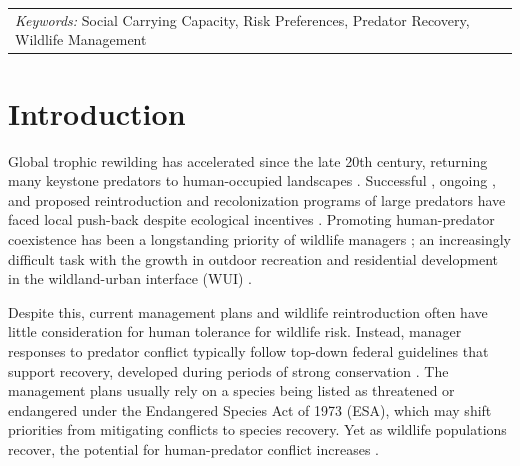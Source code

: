 \documentclass[english,12pt]{article}
\begin{document}
\noindent\begin{tabular}{ll}
\textit{Keywords:} Social Carrying Capacity, Risk Preferences, Predator Recovery, Wildlife Management\\
\end{tabular}



\thispagestyle{empty}
\newpage


\thispagestyle{empty}
\clearpage

\doublespacing
\linenumbers
\setcounter{page}{2}
\section{Introduction}
\label{sec: intro}
Global trophic rewilding has accelerated since the late 20th century, returning many keystone predators to human-occupied landscapes \citep{svenning}. Successful \citep{smith2003yellowstone, simon2012reverse}, ongoing \citep{wilting2015planning, coogan2018towards, ditmer2023predicting}, and proposed reintroduction and recolonization \citep{connolly2023jaguars, tordiffe2023case} programs of large predators have faced local push-back despite ecological incentives \citep{ripple2014status, stier2016ecosystem}. Promoting human-predator coexistence has been a longstanding priority of wildlife managers \citep{dickman2011review, nyhus2016human}; an increasingly difficult task with the growth in outdoor recreation and residential development in the wildland-urban interface (WUI) \citep{Abrahms2021Science, abrahms2023climate, ma2024global}.

Despite this, current management plans and wildlife reintroduction often have little consideration for human tolerance for wildlife risk. Instead, manager responses to predator conflict typically follow top-down federal guidelines that support recovery, developed during periods of strong conservation \citep{can2014resolving}. The management plans usually rely on a species being listed as threatened or endangered under the Endangered Species Act of 1973 (ESA), which may shift priorities from mitigating conflicts to species recovery. Yet as wildlife populations recover, the potential for human-predator conflict increases  \citep{schwartz2010hazards}. 
\end{document}
